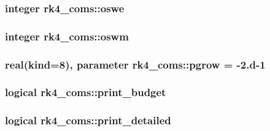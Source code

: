 \subsubsection[{\texorpdfstring{oswe}{oswe}}]{\setlength{\rightskip}{0pt plus 5cm}integer rk4\+\_\+coms\+::oswe}\hypertarget{namespacerk4__coms_ae9733bb77416a4d137c65ddd1adc5c23}{}\label{namespacerk4__coms_ae9733bb77416a4d137c65ddd1adc5c23}
\subsubsection[{\texorpdfstring{oswm}{oswm}}]{\setlength{\rightskip}{0pt plus 5cm}integer rk4\+\_\+coms\+::oswm}\hypertarget{namespacerk4__coms_a588b443c0107fd03a7642394a2df5cc9}{}\label{namespacerk4__coms_a588b443c0107fd03a7642394a2df5cc9}
\subsubsection[{\texorpdfstring{pgrow}{pgrow}}]{\setlength{\rightskip}{0pt plus 5cm}real(kind=8), parameter rk4\+\_\+coms\+::pgrow = -\/2.d-\/1}\hypertarget{namespacerk4__coms_a796865569153ec93dae2cc10d6dd7909}{}\label{namespacerk4__coms_a796865569153ec93dae2cc10d6dd7909}
\subsubsection[{\texorpdfstring{print\+\_\+budget}{print_budget}}]{\setlength{\rightskip}{0pt plus 5cm}logical rk4\+\_\+coms\+::print\+\_\+budget}\hypertarget{namespacerk4__coms_a062e3f5a857cb1364f87fda6223f2259}{}\label{namespacerk4__coms_a062e3f5a857cb1364f87fda6223f2259}
\subsubsection[{\texorpdfstring{print\+\_\+detailed}{print_detailed}}]{\setlength{\rightskip}{0pt plus 5cm}logical rk4\+\_\+coms\+::print\+\_\+detailed}\hypertarget{namespacerk4__coms_a9b7ff048a348436a9163405f31d72e29}{}\label{namespacerk4__coms_a9b7ff048a348436a9163405f31d72e29}
